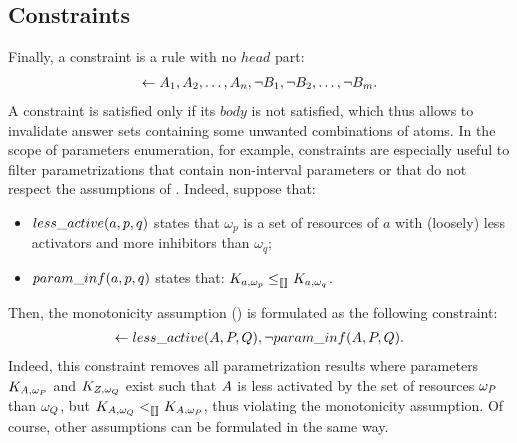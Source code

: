 
\subsection{Constraints}\label{sssec:constraints}
Finally, a constraint is a rule with no $head$ part:
\begin{align*}
  \leftarrow A_1, A_2, \dots, A_n, \neg B_1, \neg B_2, \dots, \neg B_m.
\end{align*}
A constraint is satisfied only if its $body$ is not satisfied,
which thus allows to invalidate answer sets containing some unwanted combinations of atoms.
In the scope of parameters enumeration, for example, constraints are especially useful to filter parametrizations
that contain non-interval parameters or that do not respect the assumptions of .
Indeed, suppose that:
\begin{itemize}
  \item $less\_active(a, p, q)$ states that $\omega_p$ is a set of resources of $a$ with (loosely) less activators and more inhibitors than $\omega_q$;
  \item $param\_inf(a, p, q)$ states that: $K_{a,\omega_p} \leq_{\llbracket\rrbracket} K_{a,\omega_q}$.
\end{itemize}
Then, the monotonicity assumption () is formulated as the following constraint:
\begin{align*}
  \leftarrow less\_active(A, P, Q), \neg param\_inf(A, P, Q).
\end{align*}
Indeed, this constraint removes all parametrization results where parameters $K_{A,\omega_P}$ and $K_{Z,\omega_Q}$ exist
such that $A$ is less activated by the set of resources $\omega_P$ than $\omega_Q$,
but $K_{A,\omega_Q} <_{\llbracket\rrbracket} K_{A,\omega_P}$,
thus violating the monotonicity assumption.
Of course, other assumptions can be formulated in the same way.

